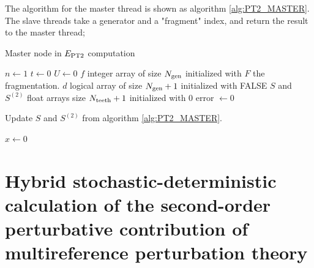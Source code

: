 \documentclass[./thesis.tex]{subfiles}
\begin{document}
The algorithm for the master thread is shown as algorithm \ref{alg:PT2_MASTER}. The slave threads take a generator and a "fragment" index, and return the result to the master thread;

\begin{algorithm}
	\caption{Master node in $E_\text{PT2}$ computation}
	\label{alg:PT2_MASTER}
	$n \gets 1$ \;
	$t \gets 0$ \;
	$U \gets 0$ \;
	$f$ integer array of size ${N_\text{gen}}$ initialized with $F$ the fragmentation. \;
	$d$ logical array of size ${N_\text{gen}}+1$ initialized with FALSE \;
	$S$ and $S^{(2)}$ float arrays size $N_\text{teeth}+1$ initialized with $0$ \;
        error $\gets 0$ \;
\end{algorithm}


\begin{algorithm}
	\caption{Update $S$ and $S^{(2)}$ from algorithm \ref{alg:PT2_MASTER}.}
	\label{alg:UPDATE_S}
	
					
	$x \gets 0$ \;
\end{algorithm}



\clearpage

\section{Hybrid stochastic-deterministic calculation of the second-order
perturbative contribution of multireference perturbation theory}

\end{document}
